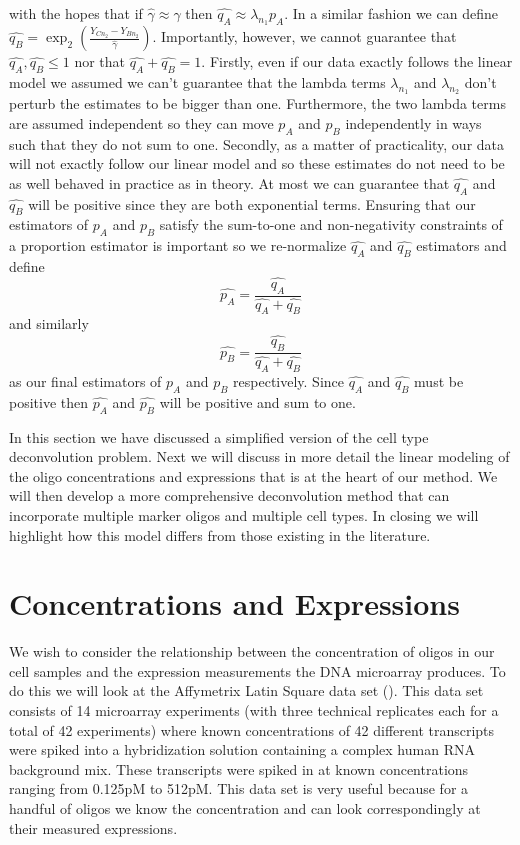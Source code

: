 \documentclass[reqno,12pt,oneside]{report}\usepackage[]{graphicx}\usepackage[]{color}
\theoremstyle{plain}
\theoremstyle{definition}
\theoremstyle{remark}
\numberwithin{theorem}{chapter}     %
\begin{document}
with the hopes that if $\widehat{\gamma}\approx\gamma$ then $\widehat{q_A}\approx \lambda_{n_1} p_A$. In a similar fashion we can define $\widehat{q_B} = \exp_2\left(\frac{Y_{Cn_2}-Y_{Bn_2}}{\widehat{\gamma}}\right)$. Importantly, however, we cannot guarantee that $\widehat{q_A},\widehat{q_B}\leq 1$ nor that $\widehat{q_A}+\widehat{q_B} = 1$. Firstly, even if our data exactly follows the linear model we assumed we can't guarantee that the lambda terms $\lambda_{n_1}$ and $\lambda_{n_2}$ don't perturb the estimates to be bigger than one. Furthermore, the two lambda terms are assumed independent so they can move $p_A$ and $p_B$ independently in ways such that they do not sum to one. Secondly, as a matter of practicality, our data will not exactly follow our linear model and so these estimates do not need to be as well behaved in practice as in theory. At most we can guarantee that $\widehat{q_A}$ and $\widehat{q_B}$ will be positive since they are both exponential terms. Ensuring that our estimators of $p_A$ and $p_B$ satisfy the sum-to-one and non-negativity constraints of a proportion estimator is important so we re-normalize $\widehat{q_A}$ and $\widehat{q_B}$ estimators and define
\[
\widehat{p_A} = \frac{\widehat{q_A}}{\widehat{q_A}+\widehat{q_B}}
\]
and similarly 
\[
\widehat{p_B} = \frac{\widehat{q_B}}{\widehat{q_A}+\widehat{q_B}}
\]
as our final estimators of $p_A$ and $p_B$ respectively. Since $\widehat{q_A}$ and $\widehat{q_B}$ must be positive then $\widehat{p_A}$ and $\widehat{p_B}$ will be positive and sum to one. 

In this section we have discussed a simplified version of the cell type deconvolution problem. Next we will discuss in more detail the linear modeling of the oligo concentrations and expressions that is at the heart of our method. We will then develop a more comprehensive deconvolution method that can incorporate multiple marker oligos and multiple cell types. In closing we will highlight how this model differs from those existing in the literature.

\section{Concentrations and Expressions}

We wish to consider the relationship between the concentration of oligos in our cell samples and the expression measurements the DNA microarray produces. To do this we will look at the Affymetrix Latin Square data set (\cite{latin}). This data set consists of 14 microarray experiments (with three technical replicates each for a total of 42 experiments) where known concentrations of 42 different transcripts were spiked into a hybridization solution containing a complex human RNA background mix. These transcripts were spiked in at known concentrations ranging from 0.125pM to 512pM. This data set is very useful because for a handful of oligos we know the concentration and can look correspondingly at their measured expressions.
\end{document}
